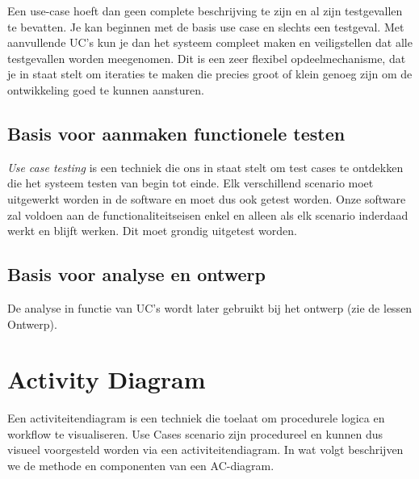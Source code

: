 Een use-case hoeft dan geen complete beschrijving te zijn en al zijn testgevallen te bevatten. Je kan beginnen met de basis use case en slechts een testgeval. Met aanvullende UC's kun je dan het systeem compleet maken en veiligstellen dat alle testgevallen worden meegenomen. Dit is een zeer
flexibel opdeelmechanisme, dat je in staat stelt om iteraties te maken die precies groot of klein genoeg zijn
om de ontwikkeling goed te kunnen aansturen.


\subsection{Basis voor aanmaken functionele testen}
\textit{Use case testing} is een techniek die ons in staat stelt om test cases te ontdekken die het systeem testen van begin tot einde. Elk verschillend scenario moet uitgewerkt worden in de software en moet dus ook getest worden. Onze software zal voldoen aan de functionaliteitseisen enkel en alleen als elk scenario inderdaad werkt en blijft werken. Dit moet grondig uitgetest worden.


\subsection{Basis voor analyse en ontwerp}
De analyse in functie van UC's wordt later gebruikt bij het ontwerp (zie de lessen Ontwerp).


\section{Activity Diagram}
Een activiteitendiagram is een techniek die toelaat om procedurele logica en workflow te visualiseren. Use Cases scenario zijn procedureel en kunnen dus visueel voorgesteld worden via een activiteitendiagram.
In wat volgt beschrijven we de methode en componenten van een AC-diagram.


